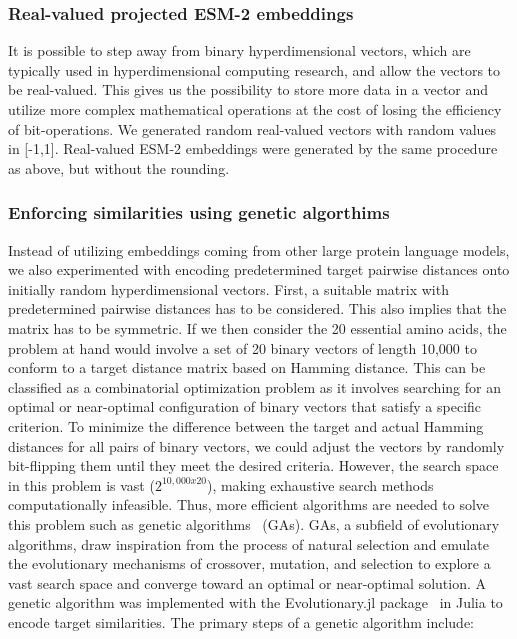 \subsubsection*{Real-valued projected ESM-2 embeddings}
It is possible to step away from binary hyperdimensional vectors, which are typically used in hyperdimensional computing research, and allow the vectors to be real-valued. This gives us the possibility to store more data in a vector and utilize more complex mathematical operations at the cost of losing the efficiency of bit-operations. We generated random real-valued vectors with random values in [-1,1]. Real-valued ESM-2 embeddings were generated by the same procedure as above, but without the rounding.
\subsubsection*{Enforcing similarities using genetic algorthims}
Instead of utilizing embeddings coming from other large protein language models, we also experimented with encoding predetermined target pairwise distances onto initially random hyperdimensional vectors. First, a suitable matrix with predetermined pairwise distances has to be considered. This also implies that the matrix has to be symmetric. If we then consider the 20 essential amino acids, the problem at hand would involve a set of 20 binary vectors of length 10,000 to conform to a target distance matrix based on Hamming distance. This can be classified as a combinatorial optimization problem as it involves searching for an optimal or near-optimal configuration of binary vectors that satisfy a specific criterion. To minimize the difference between the target and actual Hamming distances for all pairs of binary vectors, we could adjust the vectors by randomly bit-flipping them until they meet the desired criteria. However, the search space in this problem is vast ($2^{10,000 x 20}$), making exhaustive search methods computationally infeasible. Thus, more efficient algorithms are needed to solve this problem such as genetic algorithms~\cite{GA} (GAs). GAs, a subfield of evolutionary algorithms, draw inspiration from the process of natural selection and emulate the evolutionary mechanisms of crossover, mutation, and selection to explore a vast search space and converge toward an optimal or near-optimal solution. A genetic algorithm was implemented with the Evolutionary.jl package~\cite{evojl} in Julia to encode target similarities. The primary steps of a genetic algorithm include:
